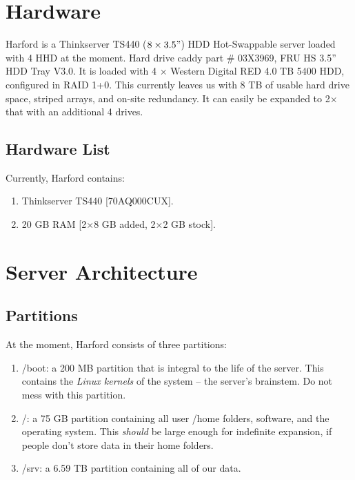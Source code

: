 \documentclass[final,titlepage,letterpaper,oneside,12pt]{article}
\renewcommand{\texttt}[2][BrickRed]{\textcolor{#1}{\ttfamily #2}}%
\begin{document}
\section{Hardware}

Harford is a \texttt{Thinkserver TS440 ($8 \times 3.5"$) HDD Hot-Swappable} server loaded with 4 HHD at the moment. Hard drive caddy part \texttt{\# 03X3969, FRU HS 3.5” HDD Tray V3.0}. It is loaded with 4 $\times$ Western Digital RED 4.0 TB 5400 HDD, configured in RAID 1+0. This currently leaves us with 8 TB of usable hard drive space, striped arrays, and on-site redundancy. It can easily be expanded to 2$\times$ that with an additional 4 drives.

\subsection{Hardware List}

Currently, Harford contains:

\begin{enumerate} \itemsep-2pt
    \item{Thinkserver TS440 [70AQ000CUX].}
    \item{20 GB RAM [2$\times$8 GB added, 2$\times$2 GB stock].}
\end{enumerate}


\section{Server Architecture}
\subsection{Partitions}

At the moment, Harford consists of three partitions: 

\begin{enumerate}
    \item{\texttt{/boot}: a 200 MB partition that is integral to the life of the server. This contains the \textit{Linux kernels} of the system -- the server's brainstem. Do not mess with this partition.}
    
    \item{\texttt{/}: a 75 GB partition containing all user \texttt{/home} folders, software, and the operating system. This \textit{should} be large enough for indefinite expansion, if people don't store data in their home folders.}
    
    \item{\texttt{/srv}: a 6.59 TB partition containing all of our data.}
\end{enumerate}
\end{document}

